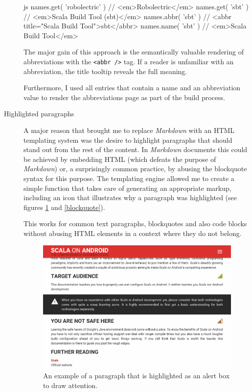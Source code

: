 \begin{description}
	\begin{code}{js}
names.get( 'robolectric' ) // <em>Robolectric</em>
names.get( 'sbt' ) // <em>Scala Build Tool (sbt)</em>
names.abbr( 'sbt' ) // <abbr title="Scala Build Tool">sbt</abbr>
names.name( 'sbt' ) // <em>Scala Build Tool</em>
	\end{code}

	The major gain of this approach is the semantically valuable rendering of abbreviations with the \texttt{<abbr />} tag. If a reader is unfamiliar with an abbreviation, the title tooltip reveals the full meaning.

	Furthermore, I used all entries that contain a name and an abbreviation value to render the abbreviations page as part of the build process.

	\item[Highlighted paragraphs]\hfill

	A major reason that brought me to replace \textit{Markdown} with an \ac{HTML} templating system was the desire to highlight paragraphs that should stand out from the rest of the content. In \textit{Markdown} documents this could be achieved by embedding \ac{HTML} (which defeats the purpose of \textit{Markdown}) or, a surprisingly common practice, by abusing the blockquote syntax for this purpose. The templating engine allowed me to create a simple function that takes care of generating an appropriate markup, including an icon that illustrates why a paragraph was highlighted (see figures \ref{alert} and \ref{blockquote}).

	\begin{code}{html}
{%
	<p>Lorem Ipsum</p>
{%
	\end{code}

	This works for common text paragraphs, blockquotes and also code blocks without abusing \ac{HTML} elements in a context where they do not belong.

	\begin{figure}[]
		\includegraphics[width=\textwidth]{asset/alert.png}
		\caption{An example of a paragraph that is highlighted as an alert box to draw attention.}
		\label{alert}
	\end{figure}


\end{description}
